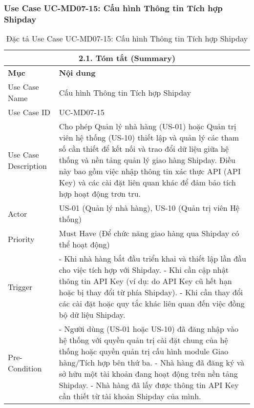 \subsubsection{Use Case UC-MD07-15: Cấu hình Thông tin Tích hợp Shipday}
\begin{longtable}{|m{4cm}|p{11cm}|}
\caption{Đặc tả Use Case UC-MD07-15: Cấu hình Thông tin Tích hợp Shipday} \label{tab:uc_md07_15_final_full} \\
\hline
\multicolumn{2}{|c|}{\textbf{2.1. Tóm tắt (Summary)}} \\
\hline
\textbf{Mục} & \textbf{Nội dung} \\
\hline
\endhead %
\hline
\endfoot %
\hline
\endlastfoot %
Use Case Name & Cấu hình Thông tin Tích hợp Shipday \\
\hline
Use Case ID & UC-MD07-15 \\
\hline
Use Case Description & Cho phép Quản lý nhà hàng (US-01) hoặc Quản trị viên hệ thống (US-10) thiết lập và quản lý các tham số cần thiết để kết nối và trao đổi dữ liệu giữa hệ thống và nền tảng quản lý giao hàng Shipday. Điều này bao gồm việc nhập thông tin xác thực API (API Key) và các cài đặt liên quan khác để đảm bảo tích hợp hoạt động trơn tru. \\
\hline
Actor & US-01 (Quản lý nhà hàng), US-10 (Quản trị viên Hệ thống) \\
\hline
Priority & Must Have (Để chức năng giao hàng qua Shipday có thể hoạt động) \\
\hline
Trigger & - Khi nhà hàng bắt đầu triển khai và thiết lập lần đầu cho việc tích hợp với Shipday. \newline - Khi cần cập nhật thông tin API Key (ví dụ: do API Key cũ hết hạn hoặc bị thay đổi từ phía Shipday). \newline - Khi cần thay đổi các cài đặt hoặc quy tắc khác liên quan đến việc đồng bộ dữ liệu Shipday. \\
\hline
Pre-Condition & - Người dùng (US-01 hoặc US-10) đã đăng nhập vào hệ thống với quyền quản trị cài đặt chung của hệ thống hoặc quyền quản trị cấu hình module Giao hàng/Tích hợp bên thứ ba. \newline - Nhà hàng đã đăng ký và sở hữu một tài khoản đang hoạt động trên nền tảng Shipday. \newline - Nhà hàng đã lấy được thông tin API Key cần thiết từ tài khoản Shipday của mình. \\

\end{longtable}

